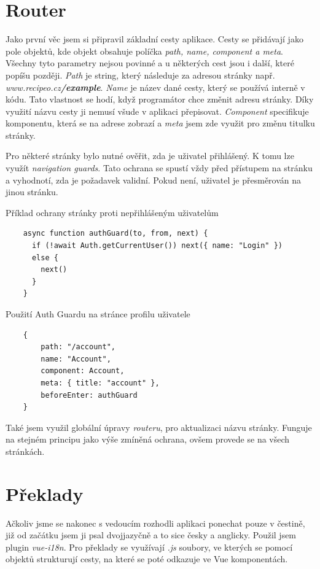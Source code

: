\section{Router}
Jako první věc jsem si připravil základní cesty aplikace. Cesty se přidávají jako pole objektů, kde objekt obsahuje políčka \emph{path, name, component \emph{a} meta}.
Všechny tyto parametry nejsou povinné a u některých cest jsou i další, které popíšu později. \emph{Path} je string, který následuje za adresou stránky např.
\emph{www.recipeo.cz\textbf{/example}}. \emph{Name} je název dané cesty, který se používá interně v kódu. Tato vlastnost se hodí, když programátor chce změnit adresu stránky.
Díky využití názvu cesty ji nemusí všude v aplikaci přepisovat. \emph{Component} specifikuje komponentu, která se na adrese zobrazí a \emph{meta} jsem zde využit pro změnu
titulku stránky.

Pro některé stránky bylo nutné ověřit, zda je uživatel přihlášený. K tomu lze využít \emph{navigation guards}. Tato ochrana se spustí
vždy před přístupem na stránku a vyhodnotí, zda je požadavek validní. Pokud není, uživatel je přesměrován na jinou stránku.

\begin{listing}[h]
    \caption{Příklad ochrany stránky proti nepřihlášeným uživatelům}
    \begin{verbatim}
    async function authGuard(to, from, next) {
      if (!await Auth.getCurrentUser()) next({ name: "Login" })
      else {
        next()
      }
    }
    \end{verbatim}
\end{listing}
\begin{listing}[h]
    \caption{Použití Auth Guardu na stránce profilu uživatele}
    \begin{verbatim}
    {
        path: "/account",
        name: "Account",
        component: Account,
        meta: { title: "account" },
        beforeEnter: authGuard
    }
    \end{verbatim}
\end{listing}

Také jsem využil globální úpravy \emph{routeru}, pro aktualizaci názvu stránky. Funguje na stejném principu jako výše zmíněná
ochrana, ovšem provede se na všech stránkách.

\section{Překlady}
Ačkoliv jsme se nakonec s vedoucím rozhodli aplikaci ponechat pouze v čestině, již od začátku jsem ji psal dvojjazyčně a to sice
česky a anglicky. Použil jsem plugin \emph{vue-i18n}. Pro překlady se využívají \emph{.js} soubory, ve kterých se pomocí objektů
strukturují cesty, na které se poté odkazuje ve Vue komponentách.

